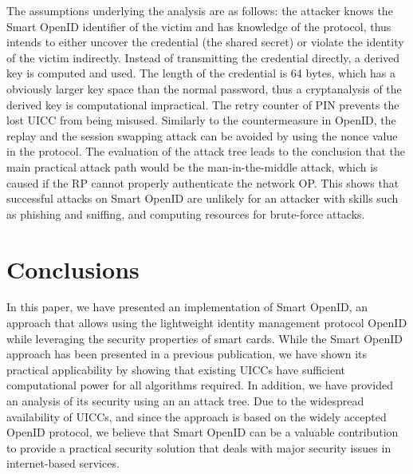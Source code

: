 \documentclass[runningheads,a4paper]{llncs}
\begin{document}
The assumptions underlying the analysis are as follows: the attacker knows the Smart OpenID identifier of the victim and has knowledge of the protocol, thus intends to either uncover the credential (the shared secret) or violate the identity of the victim indirectly. Instead of transmitting the credential directly, a derived key is computed and used. The length of the credential is 64 bytes, which has a obviously larger key space than the normal password, thus a cryptanalysis of the derived key is computational impractical. The retry counter of PIN prevents the lost UICC from being misused. Similarly to the countermeasure in OpenID, the replay and the session swapping attack can be avoided by using the nonce value in the protocol. The evaluation of the attack tree leads to the conclusion that the main practical attack path would be the man-in-the-middle attack, which is caused if the RP cannot properly authenticate the network OP. This shows that successful attacks on Smart OpenID are unlikely for an attacker with skills such as phishing and sniffing, and computing resources for brute-force attacks.

\section{Conclusions}
\label{sec:conclusions}
In this paper, we have presented an implementation of Smart OpenID, an approach that allows using the lightweight identity management protocol OpenID while leveraging the security properties of smart cards. While the Smart OpenID approach has been presented in a previous publication, we have shown its practical applicability by showing that existing UICCs have sufficient computational power for all algorithms required. In addition, we have provided an analysis of its security using an an attack tree. Due to the widespread availability of UICCs, and since the approach is based on the widely accepted OpenID protocol, we believe that Smart OpenID can be a valuable contribution to provide a practical security solution that deals with major security issues in internet-based services.


\end{document}
